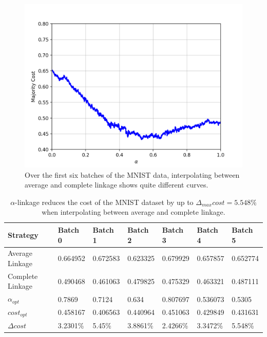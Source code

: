 \begin{figure}[h]
\begin{minipage}{.3\textwidth}
\end{minipage}
\begin{minipage}{.3\textwidth}
  \centering
  \includegraphics[width=\linewidth]{plots/mnist-ac-5}
\end{minipage}
\caption{Over the first six batches of the MNIST data, interpolating between average and complete linkage shows quite different curves.}
\label{fig:mnist1000acbatch}
\end{figure}

\begin{table}[h]
    \centering
    \begin{tabular}{|l | l l l l l l |}
    \hline
    Strategy & Batch 0 & Batch 1 & Batch 2 & Batch 3 & Batch 4 & Batch 5\\ \hline
    Average Linkage & 0.664952 & 0.672583 & 0.623325 & 0.679929 & 0.657857 & 0.652774\\
    Complete Linkage & 0.490468 & 0.461063 & 0.479825 & 0.475329 & 0.463321 & 0.487111\\
    $\alpha_{opt}$ & 0.7869 & 0.7124 & 0.634 & 0.807697 & 0.536073 & 0.5305\\
    $cost_{opt}$ & 0.458167 & 0.406563 & 0.440964 & 0.451063 & 0.429849 & 0.431631\\
    $\Delta cost$ & 3.2301\% & 5.45\% & 3.8861\% & 2.4266\% & 3.3472\% & 5.548\%\\\hline
    \end{tabular}
    \caption{$\alpha$-linkage reduces the cost of the MNIST dataset by up to $\Delta_{max} cost = 5.548\%$ when interpolating between average and complete linkage.}
    \label{table:mnist1000acbatch}
\end{table}

